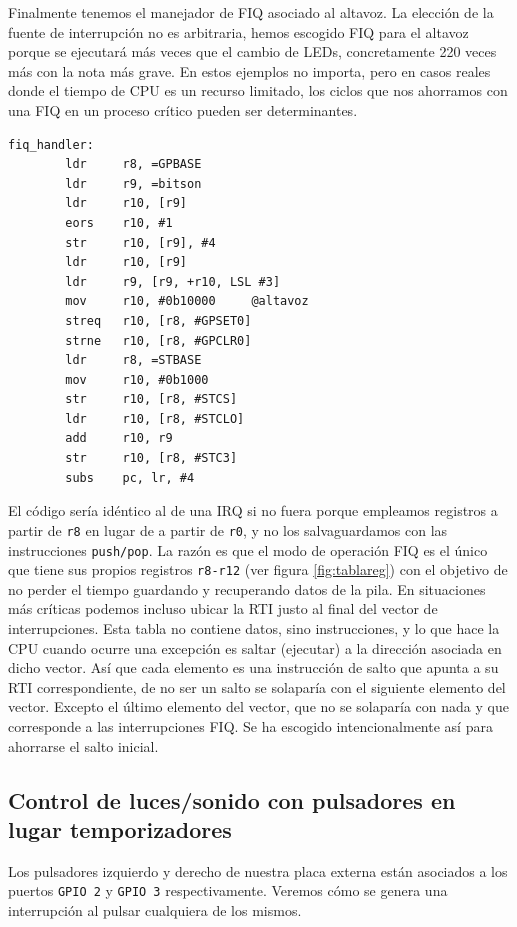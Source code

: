 Finalmente tenemos el manejador de FIQ asociado al altavoz. La elección de la fuente de
interrupción no es arbitraria, hemos escogido FIQ para el altavoz porque se ejecutará más veces
que el cambio de LEDs, concretamente 220 veces más con la nota más grave. En estos ejemplos
no importa, pero en casos reales donde el tiempo de CPU es un recurso limitado, los ciclos
que nos ahorramos con una FIQ en un proceso crítico pueden ser determinantes.

\begin{lstlisting}
fiq_handler:
        ldr     r8, =GPBASE
        ldr     r9, =bitson
        ldr     r10, [r9]
        eors    r10, #1
        str     r10, [r9], #4
        ldr     r10, [r9]
        ldr     r9, [r9, +r10, LSL #3]
        mov     r10, #0b10000     @altavoz
        streq   r10, [r8, #GPSET0]
        strne   r10, [r8, #GPCLR0]
        ldr     r8, =STBASE
        mov     r10, #0b1000
        str     r10, [r8, #STCS]
        ldr     r10, [r8, #STCLO]
        add     r10, r9
        str     r10, [r8, #STC3]
        subs    pc, lr, #4
\end{lstlisting}

El código sería idéntico al de una IRQ si no fuera porque empleamos registros a partir de
{\tt r8} en lugar de a partir de {\tt r0}, y no los salvaguardamos con las instrucciones
{\tt push/pop}. La razón es que el modo de operación FIQ es el único que tiene sus propios
registros {\tt r8-r12} (ver figura \ref{fig:tablareg}) con el objetivo de no perder el tiempo
guardando y recuperando datos de la pila. En situaciones más críticas podemos incluso ubicar
la RTI justo al final del vector de interrupciones. Esta tabla no contiene datos, sino instrucciones,
y lo que hace la CPU cuando ocurre una excepción es saltar (ejecutar) a la dirección asociada en
dicho vector. Así que cada elemento es una instrucción de salto que apunta a su RTI
correspondiente, de no ser un salto se solaparía con el siguiente elemento del vector. Excepto
el último elemento del vector, que no se solaparía con nada y que corresponde a las
interrupciones FIQ. Se ha escogido intencionalmente así para ahorrarse el salto inicial.

\subsection{Control de luces/sonido con pulsadores en lugar temporizadores}

Los pulsadores izquierdo y derecho de nuestra placa externa están asociados a los
puertos {\tt GPIO 2} y {\tt GPIO 3} respectivamente. Veremos
cómo se genera una interrupción al pulsar cualquiera de los mismos.

